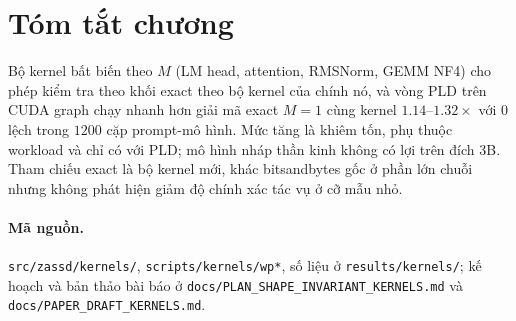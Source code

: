 \section{Tóm tắt chương}
Bộ kernel bất biến theo $M$ (LM head, attention, RMSNorm, GEMM NF4) cho phép kiểm tra theo khối exact theo bộ kernel của chính nó, và vòng PLD trên CUDA graph chạy nhanh hơn giải mã exact $M{=}1$ cùng kernel $1.14$--$1.32\times$ với $0$ lệch trong $1200$ cặp prompt-mô hình. Mức tăng là khiêm tốn, phụ thuộc workload và chỉ có với PLD; mô hình nháp thần kinh không có lợi trên đích $3$B. Tham chiếu exact là bộ kernel mới, khác bitsandbytes gốc ở phần lớn chuỗi nhưng không phát hiện giảm độ chính xác tác vụ ở cỡ mẫu nhỏ.

\paragraph{Mã nguồn.} \texttt{src/zassd/kernels/}, \texttt{scripts/kernels/wp*}, số liệu ở \texttt{results/kernels/}; kế hoạch và bản thảo bài báo ở \texttt{docs/PLAN\_SHAPE\_INVARIANT\_KERNELS.md} và \texttt{docs/PAPER\_DRAFT\_KERNELS.md}.
